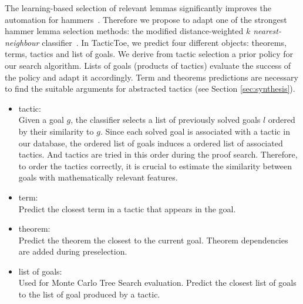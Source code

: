 \documentclass[runningheads,a4paper,draft]{svjour3}
\def\tactictoe{\textsf{TacticToe}\xspace}
\begin{document}
The learning-based selection of relevant lemmas significantly improves the 
automation for hammers~\cite{BlanchetteGKKU16}. Therefore we propose to adapt 
one of the strongest hammer lemma selection 
methods: the modified distance-weighted \emph{$k$ nearest-neighbour} 
classifier~\cite{ckju-pxtp13,DudaniS76}.
In \tactictoe, we predict four different objects: theorems, terms, tactics and 
list of goals. We derive from tactic selection a prior policy for 
our search algorithm. Lists of goals (products of tactics) evaluate the success 
of the policy and adapt it accordingly. Term and theorems predictions are 
necessary to find the suitable arguments for abstracted tactics (see Section 
\ref{sec:synthesis}).




\begin{itemize}
\item tactic:\\
Given a goal $g$, the classifier selects a list of previously solved goals $l$
ordered by their similarity to $g$. Since each solved goal is associated 
with a tactic in our database, the ordered list of goals induces a ordered  
list of associated tactics. And tactics are tried in this order during the 
proof search. Therefore, to order the tactics correctly, it is crucial to 
estimate the similarity between goals with mathematically relevant features.
\item term:\\
Predict the closest term in a tactic that appears in the goal.

\item theorem:\\
Predict the theorem the closest to the current goal. Theorem dependencies are 
added during preselection.

\item list of goals:\\
Used for Monte Carlo Tree Search evaluation. Predict the closest list of goals
to the list of goal produced by a tactic.
\end{itemize}
\end{document}
